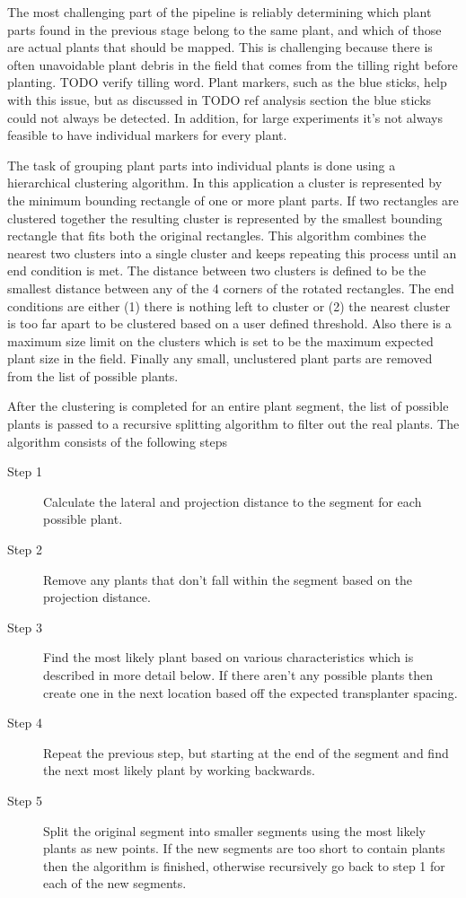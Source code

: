 The most challenging part of the pipeline is reliably determining which plant parts found in the previous stage belong to the same plant, and which of those are actual plants that should be mapped.  This is challenging because there is often unavoidable plant debris in the field that comes from the tilling right before planting. TODO verify tilling word.  Plant markers, such as the blue sticks, help with this issue, but as discussed in TODO ref analysis section the blue sticks could not always be detected.  In addition, for large experiments it's not always feasible to have individual markers for every plant.  

The task of grouping plant parts into individual plants is done using a hierarchical clustering algorithm.  In this application a cluster is represented by the minimum bounding rectangle of one or more plant parts.  If two rectangles are clustered together the resulting cluster is represented by the smallest bounding rectangle that fits both the original rectangles.  This algorithm combines the nearest two clusters into a single cluster and keeps repeating this process until an end condition is met.  The distance between two clusters is defined to be the smallest distance between any of the 4 corners of the rotated rectangles.   The end conditions are either (1) there is nothing left to cluster or (2) the nearest cluster is too far apart to be clustered based on a user defined threshold.  Also there is a maximum size limit on the clusters which is set to be the maximum expected plant size in the field.  Finally any small, unclustered plant parts are removed from the list of possible plants. 

After the clustering is completed for an entire plant segment, the list of possible plants is passed to a recursive splitting algorithm to filter out the real plants. The algorithm consists of the following steps

\begin{description}
\item[Step 1] Calculate the lateral and projection distance to the segment for each possible plant.  
\item[Step 2] Remove any plants that don't fall within the segment based on the projection distance.
\item[Step 3] Find the most likely plant based on various characteristics which is described in more detail below.  If there aren't any possible plants then create one in the next location based off the expected transplanter spacing.  
\item[Step 4] Repeat the previous step, but starting at the end of the segment and find the next most likely plant by working backwards.
\item[Step 5] Split the original segment into smaller segments using the most likely plants as new points.  If the new segments are too short to contain plants then the algorithm is finished, otherwise recursively go back to step 1 for each of the new segments.
\end{description}

